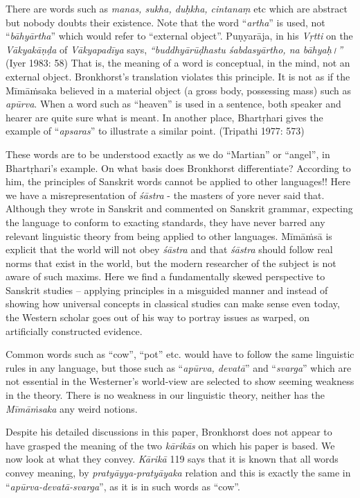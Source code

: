 There are words such as \textit{manas, sukha, duḥkha, cintanaṃ} etc which are abstract but nobody doubts their existence. Note that the word “\textit{artha}” is used, not “\textit{bāhyārtha}” which would refer to “external object”. Puṇyarāja, in his \textit{Vṛtti} on the \textit{Vākyakāṇḍa} of \textit{Vākyapadīya} says, \textit{“buddhyārūḍhastu śabdasyārtho, na bāhyaḥ।”} (Iyer 1983: 58) That is, the meaning of a word is conceptual, in the mind, not an external object. Bronkhorst’s translation violates this principle. It is not as if the Mīmāṁsaka believed in a material object (a gross body, possessing mass) such as \textit{apūrva}. When a word such as “heaven” is used in a sentence, both speaker and hearer are quite sure what is meant. In another place, Bhartṛhari gives the example of “\textit{apsaras}” to illustrate a similar point. (Tripathi 1977: 573)

These words are to be understood exactly as we do “Martian” or “angel”, in Bhartṛhari’s example. On what basis does Bronkhorst differentiate? According to him, the principles of Sanskrit words cannot be applied to other languages!! Here we have a misrepresentation of \textit{śāstra} - the masters of yore never said that. Although they wrote in Sanskrit and commented on Sanskrit grammar, expecting the language to conform to exacting standards, they have never barred any relevant linguistic theory from being applied to other languages. Mīmāṁsā is explicit that the world will not obey \textit{śāstra} and that \textit{śāstra} should follow real norms that exist in the world, but the modern researcher of the subject is not aware of such maxims. Here we find a fundamentally skewed perspective to Sanskrit studies – applying principles in a misguided manner and instead of showing how universal concepts in classical studies can make sense even today, the Western scholar goes out of his way to portray issues as warped, on artificially constructed evidence.

Common words such as “cow”, “pot” etc. would have to follow the same linguistic rules in any language, but those such as “\textit{apūrva, devatā}” and “\textit{svarga}” which are not essential in the Westerner’s world-view are selected to show seeming weakness in the theory. There is no weakness in our linguistic theory, neither has the \textit{Mīmāṁsaka} any weird notions.

Despite his detailed discussions in this paper, Bronkhorst does not appear to have grasped the meaning of the two \textit{kārikās} on which his paper is based. We now look at what they convey. \textit{Kārikā} 119 says that it is known that all words convey meaning, by \textit{pratyāyya-pratyāyaka} relation and this is exactly the same in “\textit{apūrva-devatā-svarga}”, as it is in such words as “cow”.

